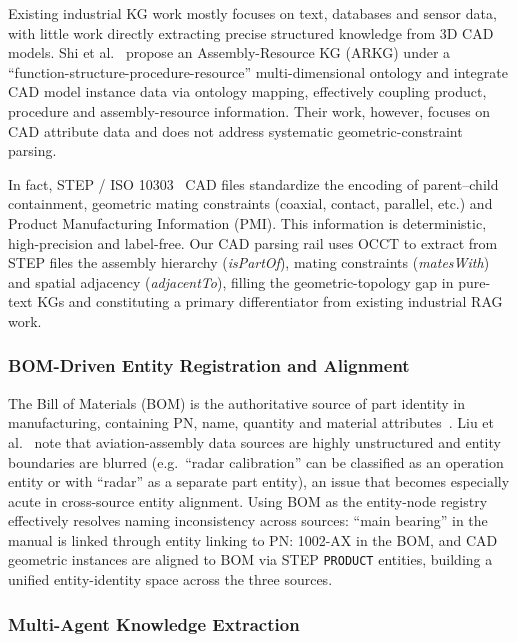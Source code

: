 \documentclass[applsci,article,submit,pdftex,moreauthors]{Definitions/mdpi}
\begin{document}
Existing industrial KG work mostly focuses on text, databases and sensor data, with little work directly extracting precise structured knowledge from 3D CAD models. Shi et al.~\citep{shi2022arkg} propose an Assembly-Resource KG (ARKG) under a ``function-structure-procedure-resource'' multi-dimensional ontology and integrate CAD model instance data via ontology mapping, effectively coupling product, procedure and assembly-resource information. Their work, however, focuses on CAD attribute data and does not address systematic geometric-constraint parsing.

In fact, STEP / ISO 10303~\citep{srinivasan2017bom} CAD files standardize the encoding of parent--child containment, geometric mating constraints (coaxial, contact, parallel, etc.) and Product Manufacturing Information (PMI). This information is deterministic, high-precision and label-free. Our CAD parsing rail uses OCCT to extract from STEP files the assembly hierarchy (\textit{isPartOf}), mating constraints (\textit{matesWith}) and spatial adjacency (\textit{adjacentTo}), filling the geometric-topology gap in pure-text KGs and constituting a primary differentiator from existing industrial RAG work.

\subsubsection{BOM-Driven Entity Registration and Alignment}

The Bill of Materials (BOM) is the authoritative source of part identity in manufacturing, containing PN, name, quantity and material attributes~\citep{srinivasan2017bom}. Liu et al.~\citep{liu2023avkg} note that aviation-assembly data sources are highly unstructured and entity boundaries are blurred (e.g.\ ``radar calibration'' can be classified as an operation entity or with ``radar'' as a separate part entity), an issue that becomes especially acute in cross-source entity alignment. Using BOM as the entity-node registry effectively resolves naming inconsistency across sources: ``main bearing'' in the manual is linked through entity linking to PN: 1002-AX in the BOM, and CAD geometric instances are aligned to BOM via STEP \texttt{PRODUCT} entities, building a unified entity-identity space across the three sources.

\subsubsection{Multi-Agent Knowledge Extraction}
\end{document}
